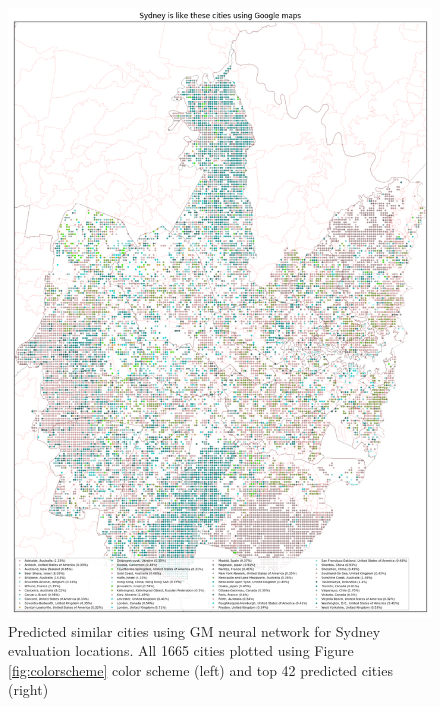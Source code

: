 \documentclass[sageh,times]{sagej}
\begin{document}
\begin{figure}[!htbp]
\includegraphics[scale=0.20]{Images/SydneyOverallAbrev_maps.png}  
\caption{Predicted similar cities using GM neural network for Sydney evaluation locations. All 1665 cities plotted using Figure \ref{fig:colorscheme} color scheme (left) and top 42 predicted cities (right)}    
 \label{fig:sydmaps}  
\end{figure} 
\end{document}
